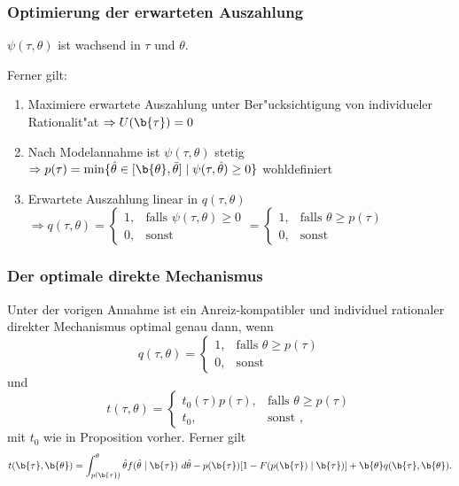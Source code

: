 \begin{frame}
  \frametitle{Optimierung der erwarteten Auszahlung}
  \justifying
  \begin{thmA}
    $\psi(\tau, \theta)$ ist wachsend in $\tau$ und $\theta$.
  \end{thmA}
    Ferner gilt:
    \begin{enumerate}
      \item Maximiere erwartete Auszahlung unter Ber"ucksichtigung von individueler Rationalit"at
      $\Rightarrow U(\b{\tau}) = 0$
      \item Nach Modelannahme ist $\psi(\tau, \theta)$ stetig $\Rightarrow p(\tau) = \min \{\hat{\theta} \in [\b{\theta}, \bar{\theta}] \mid \psi(\tau, \hat{\theta}) \ge 0 \}$
      wohldefiniert
      \item Erwartete Auszahlung linear in $q(\tau, \theta)$
      $\Rightarrow q(\tau, \theta) = \left\{\begin{array}{lr}
        1, & \text{falls } \psi(\tau, \theta) \ge 0 \\
        0, & \text{sonst }
        \end{array} = \left\{\begin{array}{lr}
          1, & \text{falls } \theta \ge p(\tau) \\
          0, & \text{sonst }
          \end{array}$
    \end{enumerate}
\end{frame}

\begin{frame}
  \frametitle{Der optimale direkte Mechanismus}
  \justifying
  \begin{thmS}
    Unter der vorigen Annahme ist ein Anreiz-kompatibler und individuel rationaler direkter Mechanismus optimal genau dann, wenn
    \begin{equation*}
      q(\tau, \theta) = \left\{\begin{array}{lr}
        1, & \text{falls } \theta \ge p(\tau) \\
        0, & \text{sonst }
        \end{array}
    \end{equation*}
    und
    \begin{equation*}
      t(\tau, \theta) = \left\{\begin{array}{lr}
        t_{0}(\tau) p(\tau), & \text{falls } \theta \ge p(\tau) \\
        t_{0}, & \text{sonst },
        \end{array}
    \end{equation*}
    mit $t_{0}$ wie in Proposition vorher. Ferner gilt
    \begin{equation*}
      t(\b{\tau}, \b{\theta}) = \int_{p(\b{\tau})}^{\theta}\hat{\theta} f(\hat{\theta} \mid \b{\tau}) \ d \hat{\theta} - p(\b{\tau}) [1 - F(p(\b{\tau}) \mid \b{\tau})] + \b{\theta} q(\b{\tau}, \b{\theta}).
    \end{equation*}
  \end{thmS}
\end{frame}
